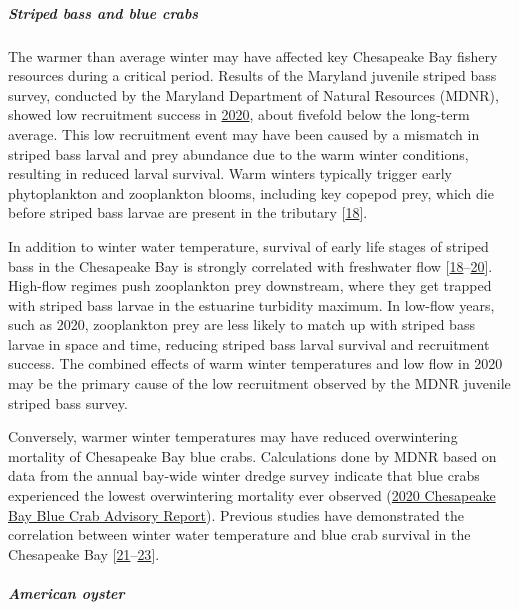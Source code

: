 \documentclass[
  10pt,
]{article}
\begin{document}
\hypertarget{striped-bass-and-blue-crabs}{%
\subparagraph{\texorpdfstring{\emph{Striped bass and blue
crabs}}{Striped bass and blue crabs}}\label{striped-bass-and-blue-crabs}}

The warmer than average winter may have affected key Chesapeake Bay
fishery resources during a critical period. Results of the Maryland
juvenile striped bass survey, conducted by the Maryland Department of
Natural Resources (MDNR), showed low recruitment success in
\href{https://news.maryland.gov/dnr/2020/10/13/chesapeake-bay-young-of-year-survey-results-released/}{2020},
about fivefold below the long-term average. This low recruitment event
may have been caused by a mismatch in striped bass larval and prey
abundance due to the warm winter conditions, resulting in reduced larval
survival. Warm winters typically trigger early phytoplankton and
zooplankton blooms, including key copepod prey, which die before striped
bass larvae are present in the tributary
{[}\protect\hyperlink{ref-millette_water_2020}{18}{]}.

In addition to winter water temperature, survival of early life stages
of striped bass in the Chesapeake Bay is strongly correlated with
freshwater flow
{[}\protect\hyperlink{ref-millette_water_2020}{18}--\protect\hyperlink{ref-north_linking_2003}{20}{]}.
High-flow regimes push zooplankton prey downstream, where they get
trapped with striped bass larvae in the estuarine turbidity maximum. In
low-flow years, such as 2020, zooplankton prey are less likely to match
up with striped bass larvae in space and time, reducing striped bass
larval survival and recruitment success. The combined effects of warm
winter temperatures and low flow in 2020 may be the primary cause of the
low recruitment observed by the MDNR juvenile striped bass survey.

Conversely, warmer winter temperatures may have reduced overwintering
mortality of Chesapeake Bay blue crabs. Calculations done by MDNR based
on data from the annual bay-wide winter dredge survey indicate that blue
crabs experienced the lowest overwintering mortality ever observed
(\href{https://www.chesapeakebay.net/documents/2020_Blue_Crab_Advisory_Report_Final_06-22-20.pdf}{2020
Chesapeake Bay Blue Crab Advisory Report}). Previous studies have
demonstrated the correlation between winter water temperature and blue
crab survival in the Chesapeake Bay
{[}\protect\hyperlink{ref-bauer_temperature-_2010}{21}--\protect\hyperlink{ref-rome_linking_2005}{23}{]}.

\hypertarget{american-oyster}{%
\subparagraph{\texorpdfstring{\emph{American
oyster}}{American oyster}}\label{american-oyster}}
\end{document}
